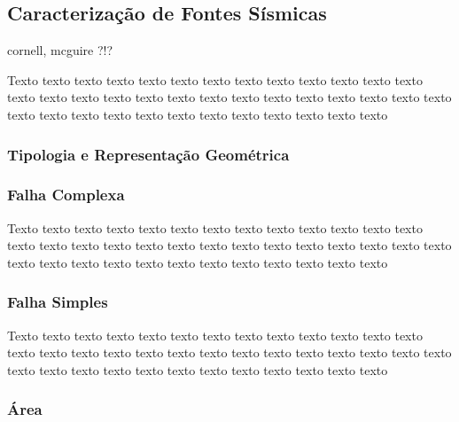 \subsection{Caracterização de Fontes Sísmicas}
\label{sec:fontes}

cornell, mcguire ?!?


Texto texto texto texto texto texto texto texto texto texto texto texto texto
texto texto texto texto texto texto texto texto texto texto texto texto texto
texto texto texto texto texto texto texto texto texto texto texto texto texto



\subsubsection{Tipologia e Representação Geométrica}
\label{sec:fontes_tipologia}


\subsubsection{Falha Complexa}
\label{sec:fonte_falha_complexa}


Texto texto texto texto texto texto texto texto texto texto texto texto texto
texto texto texto texto texto texto texto texto texto texto texto texto texto
texto texto texto texto texto texto texto texto texto texto texto texto texto



\subsubsection{Falha Simples}
\label{sec:fonte_falha_complexa}



Texto texto texto texto texto texto texto texto texto texto texto texto texto
texto texto texto texto texto texto texto texto texto texto texto texto texto
texto texto texto texto texto texto texto texto texto texto texto texto texto



\subsubsection{Área}
\label{sec:fonte_falha_complexa}


